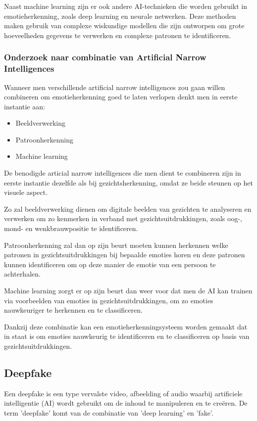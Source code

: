 Naast machine learning zijn er ook andere AI-technieken die worden gebruikt in emotieherkenning, zoals deep learning en neurale netwerken. Deze methoden maken gebruik van complexe wiskundige modellen die zijn ontworpen om grote hoeveelheden gegevens te verwerken en complexe patronen te identificeren.

\subsubsection{Onderzoek naar combinatie van Artificial Narrow Intelligences}

Wanneer men verschillende artificial narrow intelligences zou gaan willen combineren om emotieherkenning goed te laten verlopen denkt men in eerste instantie aan:

\begin{itemize}
    \item Beeldverwerking
    \item Patroonherkenning
    \item Machine learning
\end{itemize}

De benodigde articial narrow intelligences die men dient te combineren zijn in eerste instantie dezelfde als bij gezichtsherkenning, omdat ze beide steunen op het visuele aspect.

Zo zal beeldverwerking dienen om digitale beelden van gezichten te analyseren en verwerken om zo kenmerken in verband met gezichtsuitdrukkingen, zoals oog-, mond- en wenkbrauwpositie te identificeren.

Patroonherkenning zal dan op zijn beurt moeten kunnen herkennen welke patronen in gezichtsuitdrukkingen bij bepaalde emoties horen en deze patronen kunnen identificeren om op deze manier de emotie van een persoon te achterhalen.

Machine learning zorgt er op zijn beurt dan weer voor dat men de AI kan trainen via voorbeelden van emoties in gezichtsuitdrukkingen, om zo emoties nauwkeuriger te herkennen en te classificeren.

Dankzij deze combinatie kan een emotieherkenningsysteem worden gemaakt dat in staat is om emoties nauwkeurig te identificeren en te classificeren op basis van gezichtsuitdrukkingen.

\subsection{Deepfake}

Een deepfake is een type vervalste video, afbeelding of audio waarbij artificiele intelligentie (AI) wordt gebruikt om de inhoud te manipuleren en te creëren. De term 'deepfake' komt van de combinatie van 'deep learning' en 'fake'.

